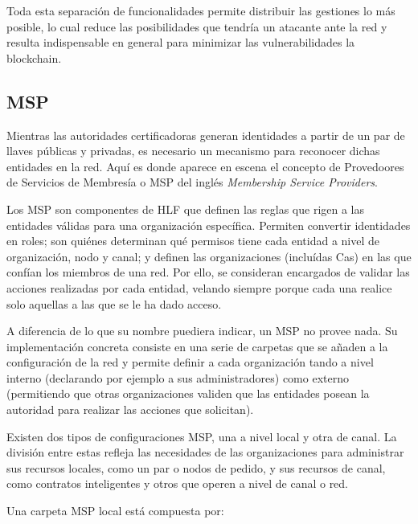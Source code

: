 Toda esta separaci\'on de funcionalidades permite distribuir las gestiones lo m\'as posible, lo cual reduce las posibilidades que tendr\'ia un atacante ante la red y resulta indispensable en general para minimizar las vulnerabilidades la blockchain.


\subsection{MSP}
Mientras las autoridades certificadoras generan identidades a partir de un par de llaves p\'ublicas y privadas, es necesario un mecanismo para reconocer dichas entidades en la red. Aqu\'i es donde aparece en escena el concepto de Provedoores de Servicios de Membres\'ia o MSP del ingl\'es \emph{Membership Service Providers}.

Los MSP son componentes de HLF que definen las reglas que rigen a las entidades v\'alidas para una organizaci\'on espec\'ifica. Permiten convertir identidades en roles; son qui\'enes determinan qu\'e permisos tiene cada entidad a nivel de organizaci\'on, nodo y canal; y definen las organizaciones (inclu\'idas Cas) en las que conf\'ian los miembros de una red. Por ello, se consideran encargados de validar las acciones realizadas por cada entidad, velando siempre porque cada una realice solo aquellas a las que se le ha dado acceso.

A diferencia de lo que su nombre puediera indicar, un MSP no provee nada. Su implementaci\'on concreta consiste en una serie de carpetas que se a\~naden a la configuraci\'on de la red y permite definir a cada organizaci\'on tando a nivel interno (declarando por ejemplo a sus administradores) como externo (permitiendo que otras organizaciones validen que las entidades posean la autoridad para realizar las acciones que solicitan).

Existen dos tipos de configuraciones MSP, una a nivel local y otra de canal. La divisi\'on entre estas refleja las necesidades de las organizaciones para administrar sus recursos locales, como un par o nodos de pedido, y sus recursos de canal, como contratos inteligentes y otros que operen a nivel de canal o red.

Una carpeta MSP local est\'a compuesta por:

